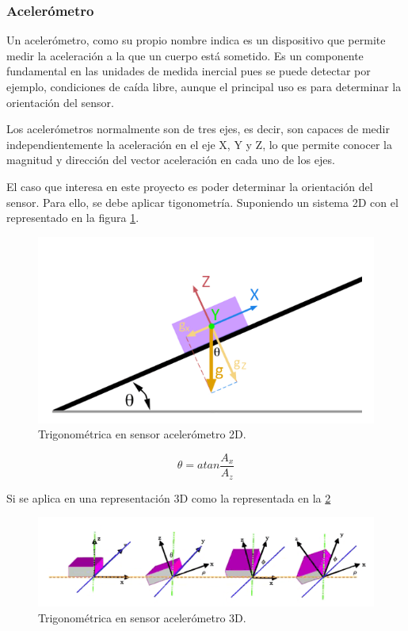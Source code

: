 \subsubsection{Acelerómetro}
Un acelerómetro, como su propio nombre indica es un dispositivo que permite medir la aceleración a la que un cuerpo está sometido. Es un componente fundamental en las unidades de medida inercial pues se puede detectar por ejemplo, condiciones de caída libre, aunque el principal uso es para determinar la orientación del sensor. \newline

Los acelerómetros normalmente son de tres ejes, es decir, son capaces de medir independientemente la aceleración en el eje X, Y y Z, lo que permite conocer la magnitud y dirección del vector aceleración en cada uno de los ejes. \newline

El caso que interesa en este proyecto es poder determinar la orientación del sensor. Para ello, se debe aplicar tigonometría. Suponiendo un sistema 2D con el representado en la figura \ref{fig:acelerometro1}.

\begin{figure}[H]
	\center
	\includegraphics[scale=0.4]{imagenes/Balancing_robot/acelerometro1}
	\caption{Trigonométrica en sensor acelerómetro 2D.}
	\label{fig:acelerometro1}
\end{figure}

\begin{equation}
\theta = atan\frac{A_{x}}{A_{z}}
\end{equation}

Si se aplica en una representación 3D como la representada en la \ref{fig:acelerometro2}

\begin{figure}[H]
	\center
	\includegraphics[scale=0.6]{imagenes/Balancing_robot/acelerometro2}
	\caption{Trigonométrica en sensor acelerómetro 3D.}
	\label{fig:acelerometro2}
\end{figure}

